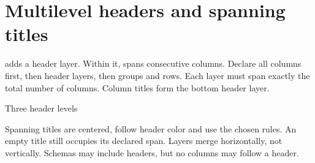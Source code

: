 \section{Multilevel headers and spanning titles}
 adds a header layer. Within it,
 spans consecutive columns. Declare all columns
first, then header layers, then groups and rows. Each layer must span exactly
the total number of columns. Column titles form the bottom header layer.
\begin{demo}{Three header levels}
\begin{center}
\begin{gradtable}[align=c,header align=c,rules=grid,header color=gradbarsBlue!8,text width=28mm,
  column sep=8pt,row padding=3pt]
\end{gradtable}
\end{center}
\end{demo}
Spanning titles are centered, follow header color and use the chosen rules.
An empty title still occupies its declared span. Layers merge horizontally,
not vertically. Schemas may include headers, but no columns may follow a header.
